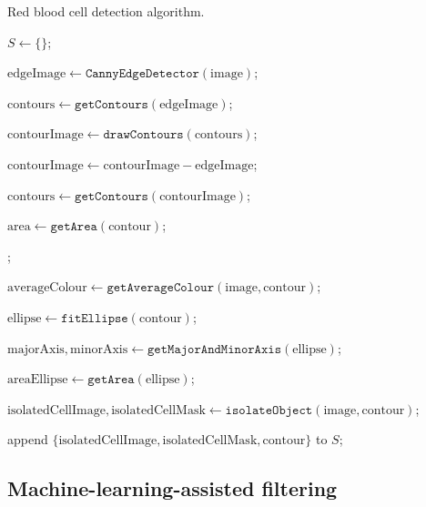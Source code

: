 \begin{algorithm}[!ht]
    \caption{Red blood cell detection algorithm.}\label{alg:rbc-detection}


    $S \gets \{\}$;

    $\mathrm{edgeImage} \gets \texttt{CannyEdgeDetector}(\mathrm{image})$;

    $\mathrm{contours} \gets \texttt{getContours}(\mathrm{edgeImage})$;

    $\mathrm{contourImage} \gets \texttt{drawContours}(\mathrm{contours})$;

    $\mathrm{contourImage} \gets \mathrm{contourImage} - \mathrm{edgeImage}$;

    $\mathrm{contours} \gets \texttt{getContours}(\mathrm{contourImage})$;

     {
        $\mathrm{area} \gets \texttt{getArea}(\mathrm{contour})$;

        ;
        {
            $\mathrm{averageColour} \gets \texttt{getAverageColour}(\mathrm{image},\mathrm{contour})$;

            {
                $\mathrm{ellipse} \gets \texttt{fitEllipse}(\mathrm{contour})$;

                $\mathrm{majorAxis},\mathrm{minorAxis} \gets \texttt{getMajorAndMinorAxis}(\mathrm{ellipse})$;

                $\mathrm{areaEllipse} \gets \texttt{getArea}(\mathrm{ellipse})$;

                {
                    $\mathrm{isolatedCellImage},\mathrm{isolatedCellMask} \gets \texttt{isolateObject}(\mathrm{image},\mathrm{contour})$;

                    append $\{\mathrm{isolatedCellImage},\mathrm{isolatedCellMask},\mathrm{contour}\}$ to $S$;
                }
            }
        }
    }
\end{algorithm}    

\subsection{Machine-learning-assisted filtering}


